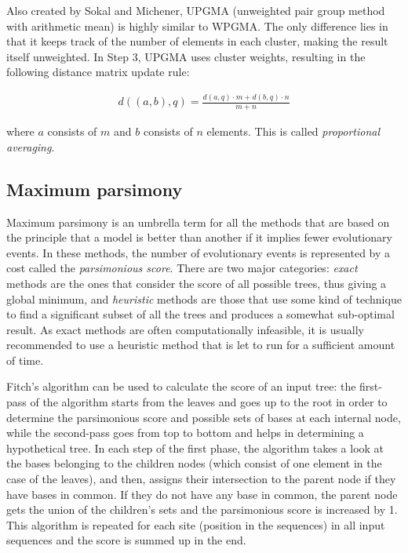 \documentclass[11pt,twocolumn]{article}
\begin{document}
Also created by Sokal and Michener, UPGMA (unweighted pair group method with arithmetic mean) is highly similar to WPGMA. The only difference lies in that it keeps track of the number of elements in each cluster, making the result itself unweighted. In Step 3, UPGMA uses cluster weights, resulting in the following distance matrix update rule:

\begin{align}
d((a, b), q) = \frac{d(a, q) \cdot m + d(b, q) \cdot n}{m + n}
\end{align}

where $a$ consists of $m$ and $b$ consists of $n$ elements. This is called \textit{proportional averaging}.

\subsection*{Maximum parsimony}

Maximum parsimony is an umbrella term for all the methods that are based on the principle that a model is better than another if it implies fewer evolutionary events. In these methods, the number of evolutionary events is represented by a cost called the \textit{parsimonious score}. There are two major categories: \textit{exact} methods are the ones that consider the score of all possible trees, thus giving a global minimum, and \textit{heuristic} methods are those that use some kind of technique to find a significant subset of all the trees and produces a somewhat sub-optimal result. As exact methods are often computationally infeasible, it is usually recommended to use a heuristic method that is let to run for a sufficient amount of time.

Fitch's algorithm can be used to calculate the score of an input tree: the first-pass of the algorithm starts from the leaves and goes up to the root in order to determine the parsimonious score and possible sets of bases at each internal node, while the second-pass goes from top to bottom and helps in determining a hypothetical tree. In each step of the first phase, the algorithm takes a look at the bases belonging to the children nodes (which consist of one element in the case of the leaves), and then, assigns their intersection to the parent node if they have bases in common. If they do not have any base in common, the parent node gets the union of the children's sets and the parsimonious score is increased by 1. This algorithm is repeated for each site (position in the sequences) in all input sequences and the score is summed up in the end.
\end{document}
